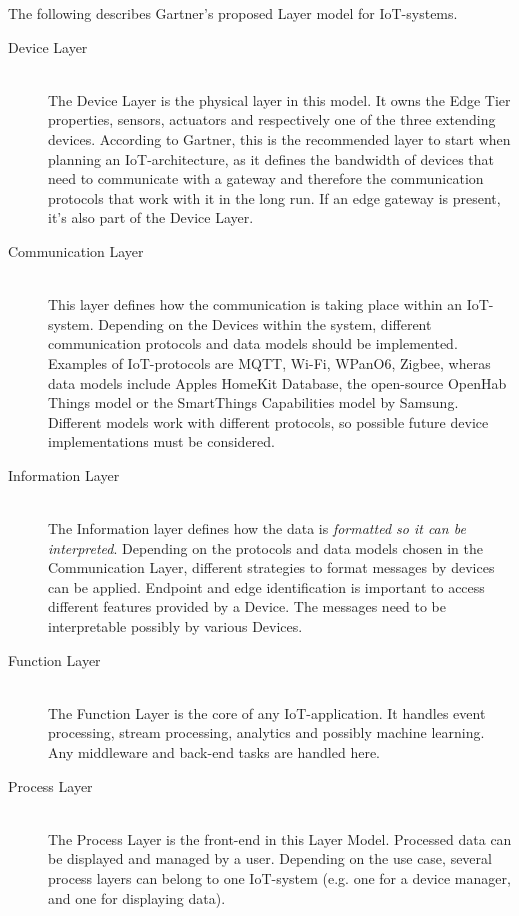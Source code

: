 The following describes Gartner's proposed Layer model for IoT-systems.

\begin{description}
    \item[Device Layer] \hfill \\
    The Device Layer is the physical layer in this model. 
    It owns the Edge Tier properties, sensors, actuators and respectively one of the three extending devices. 
    According to Gartner, this is the recommended layer to start when planning an IoT-architecture, as it defines the bandwidth of devices that need 
    to communicate with a gateway and therefore the communication protocols that work with it in the long run.
    If an edge gateway is present, it's also part of the Device Layer.
    \item[Communication Layer] \hfill \\
    This layer defines how the communication is taking place within an IoT-system.
    Depending on the Devices within the system, different communication protocols and data models should be implemented.
    Examples of IoT-protocols are MQTT, Wi-Fi, WPanO6, Zigbee, 
    wheras data models include Apples HomeKit Database, the open-source OpenHab Things model or the SmartThings Capabilities model by Samsung. 
    Different models work with different protocols, 
    so possible future device implementations must be considered.
    \item[Information Layer]  \hfill \\ 
    The Information layer defines how the data is \textit{formatted so it can be interpreted}.
    Depending on the protocols and data models chosen in the Communication Layer, 
    different strategies to format messages by devices can be applied.
    Endpoint and edge identification is important to access different features provided by a Device.
    The messages need to be interpretable possibly by various Devices.
    \item[Function Layer] \hfill \\ 
    The Function Layer is the core of any IoT-application.
    It handles event processing, stream processing, analytics and possibly machine learning.
    Any middleware and back-end tasks are handled here.
    \item[Process Layer]   \hfill \\
    The Process Layer is the front-end in this Layer Model. Processed data can be displayed and managed by a user. 
    Depending on the use case, several process layers can belong to one IoT-system (e.g. one for a device manager, and one for displaying data).
\end{description}

